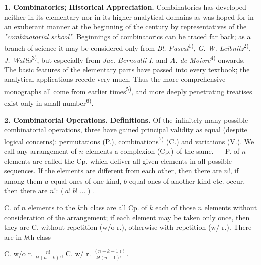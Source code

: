 \thispagestyle{fancy}

\vspace{0.5cm}

\textbf{1. Combinatorics; Historical Appreciation.} Combinatorics has developed neither in its elementary nor in its higher analytical domains as was hoped for in an exuberant manner at the beginning of the century by representatives of the \textit{"combinatorial school"}. Beginnings of combinatorics can be traced far back; as a branch of science it may be considered only from \textit{Bl. Pascal}\textsuperscript{1)}, \textit{G. W. Leibnitz}\textsuperscript{2)}, \textit{J. Wallis}\textsuperscript{3)}, but especially from \textit{Jac. Bernoulli I.} and \textit{A. de Moivre}\textsuperscript{4)} onwards. The basic features of the elementary parts have passed into every textbook; the analytical applications recede very much. Thus the more comprehensive monographs all come from earlier times\textsuperscript{5)}, and more deeply penetrating treatises exist only in small number\textsuperscript{6)}.

\vspace{0.2cm}

\textbf{2. Combinatorial Operations. Definitions.} Of the infinitely many possible combinatorial operations, three have gained principal validity as equal (despite logical concerns): permutations (P.), combinations\textsuperscript{7)} (C.) and variations (V.). We call any arrangement of $n$ elements a complexion (Cp.) of the same. — P. of $n$ elements are called the Cp. which deliver all given elements in all possible sequences. If the elements are different from each other, then there are $n!$, if among them $a$ equal ones of one kind, $b$ equal ones of another kind etc. occur, then there are $n!:(a!\;b!\;...)$.

C. of $n$ elements to the $k$th class are all Cp. of $k$ each of those $n$ elements without consideration of the arrangement; if each element may be taken only once, then they are C. without repetition (w/o r.), otherwise with repetition (w/ r.). There are in $k$th class

\vspace{-0.1cm}
\begin{center}
    C. w/o r. \quad $ \frac{n!}{k!(n-k)!}$, \quad C. w/ r. \quad $\frac{(n+k-1)!}{k!(n-1)!}$ .
\end{center}
\vspace{-0.3cm}

